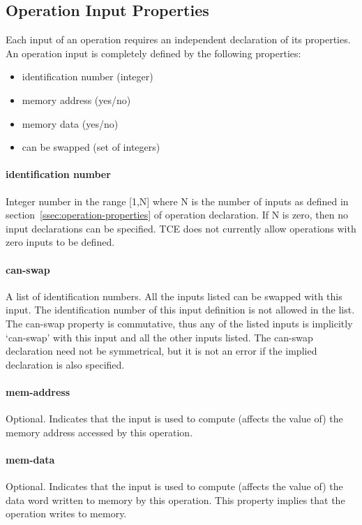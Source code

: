 \documentclass[twoside]{tceusermanual}
\begin{document}
\subsection{Operation Input Properties}
\label{ssec:opinput-properties}

Each input of an operation requires an independent declaration of its
properties.  An operation input is completely defined by the following
properties:
\begin{itemize}
\item identification number (integer)
\item memory address (yes/no)
\item memory data (yes/no)
\item can be swapped (set of integers)
\end{itemize}

\paragraph{identification number}
Integer number in the range [1,N] where N is the number of inputs as defined
in section~\ref{ssec:operation-properties} of operation declaration.  If N
is zero, then no input declarations can be specified. TCE does not currently
allow operations with zero inputs to be defined.

\paragraph{can-swap}
A list of identification numbers.  All the inputs listed can be swapped with
this input.  The identification number of this input definition is not
allowed in the list.  The can-swap property is commutative, thus any of the
listed inputs is implicitly `can-swap' with this input and all the other
inputs listed.  The can-swap declaration need not be symmetrical, but it is
not an error if the implied declaration is also specified.

\paragraph{mem-address}
Optional.  Indicates that the input is used to compute (affects the value
of) the memory address accessed by this operation.

\paragraph{mem-data}
Optional.  Indicates that the input is used to compute (affects the value
of) the data word written to memory by this operation.  This property
implies that the operation writes to memory.
\end{document}
